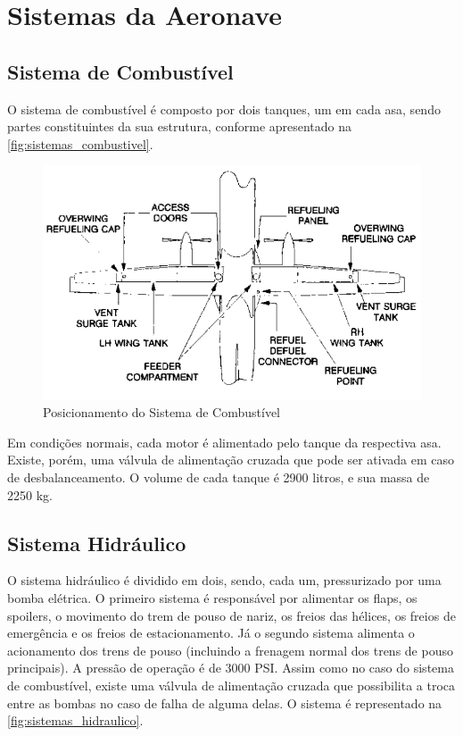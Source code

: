 \chapter{Sistemas da Aeronave}


\section{Sistema de Combustível}

O sistema de combustível é composto por dois tanques, um em cada asa, sendo partes constituintes da sua estrutura, conforme apresentado na \autoref{fig:sistemas_combustivel}.

\begin{figure}
\centering
\includegraphics[width=\textwidth]{images/parte3/sistemas_combustivel.png}
\caption{Posicionamento do Sistema de Combustível}
\label{fig:sistemas_combustivel}
\end{figure}

Em condições normais, cada motor é alimentado pelo tanque da respectiva asa.
Existe, porém, uma válvula de alimentação cruzada que pode ser ativada em caso de desbalanceamento.
O volume de cada tanque é 2900 litros, e sua massa de 2250 kg.


\section{Sistema Hidráulico}

O sistema hidráulico é dividido em dois, sendo, cada um, pressurizado por uma bomba elétrica.
O primeiro sistema é responsável por alimentar os flaps, os spoilers, o movimento do trem de pouso de nariz, os freios das hélices, os freios de emergência e os freios de estacionamento.
Já o segundo sistema alimenta o acionamento dos trens de pouso (incluindo a frenagem normal dos trens de pouso principais).
A pressão de operação é de 3000 PSI.
Assim como no caso do sistema de combustível, existe uma válvula de alimentação cruzada que possibilita a troca entre as bombas no caso de falha de alguma delas.
O sistema é representado na \autoref{fig:sistemas_hidraulico}.

